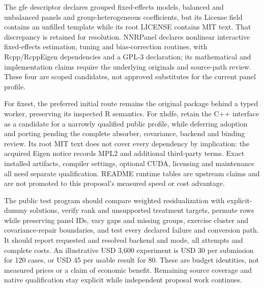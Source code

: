 The gfe descriptor declares grouped fixed-effects models, balanced and
unbalanced panels and group-heterogeneous coefficients, but its License field
contains an unfilled template while its root LICENSE contains MIT text.
That discrepancy is retained for resolution. NNRPanel declares nonlinear
interactive fixed-effects estimation, tuning and bias-correction routines,
with Rcpp/RcppEigen dependencies and a GPL-3 declaration; its mathematical
and implementation claims require the underlying originals and source-path
review. These four are scoped candidates, not approved substitutes for the
current panel profile.~\citep{exec25_panelcxx_gfe,exec25_panelcxx_nnr}

For fixest, the preferred initial route remains the original package behind
a typed worker, preserving its inspected R semantics. For xhdfe, retain
the C++ interface as a candidate for a narrowly qualified public profile,
while deferring adoption and porting pending the complete absorber,
covariance, backend and binding review. Its root MIT text does not cover
every dependency by implication: the acquired Eigen notice records MPL2
and additional third-party terms. Exact installed artifacts, compiler
settings, optional CUDA, licensing and maintenance all need separate
qualification. README runtime tables are upstream claims and are not
promoted to this proposal's measured speed or cost advantage.
\citep{exec20_fixest_source,exec25_panelcxx_xhdfe,exec25_panelcxx_reference}

The public test program should compare weighted residualization with
explicit-dummy solutions, verify rank and unsupported treatment targets,
permute rows while preserving panel IDs, vary gaps and missing groups,
exercise cluster and covariance-repair boundaries, and test every declared
failure and conversion path. It should report requested and resolved
backend and mode, all attempts and complete costs. An illustrative USD
3,600 experiment is USD 30 per submission for 120 cases, or USD 45 per
usable result for 80. These are budget identities, not measured prices
or a claim of economic benefit. Remaining source coverage and native
qualification stay explicit while independent proposal work continues.
\citep{exec25_panelcxx_reference}
